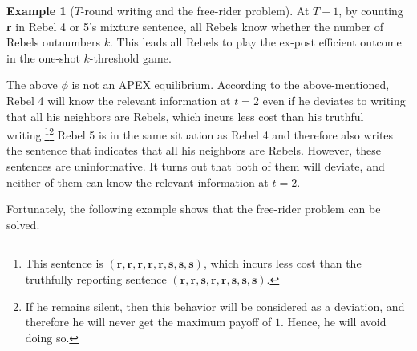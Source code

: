 \documentclass[12pt,letter]{article}
\newcommand\omicron{o}
\theoremstyle{definition}
\newtheorem{example}{Example}
\theoremstyle{definition}
\theoremstyle{remark}
\theoremstyle{claim}
\begin{document}
\begin{example}[$T$-round writing and the free-rider problem]
At $T+1$, by counting \textbf{r} in Rebel 4 or 5's mixture sentence, all Rebels know whether the number of Rebels outnumbers $k$. This leads all Rebels to play the ex-post efficient outcome in the one-shot $k$-threshold game. 

The above $\phi$ is not an APEX equilibrium. According to the above-mentioned, Rebel 4 will know the relevant information at $t=2$ even if he deviates to writing that all his neighbors are Rebels, which incurs less cost than his truthful writing.\footnote{This sentence is $(\textbf{r},\textbf{r},\textbf{r},\textbf{r},\textbf{r},\textbf{s},\textbf{s},\textbf{s})$, which incurs less cost than the truthfully reporting sentence $(\textbf{r},\textbf{r},\textbf{s},\textbf{r},\textbf{r},\textbf{s},\textbf{s},\textbf{s})$.}\footnote{If he remains silent, then this behavior will be considered as a deviation, and therefore he will never get the maximum payoff of $1$. Hence, he will avoid doing so.}
Rebel 5 is in the same situation as Rebel 4 and therefore also writes the sentence that indicates that all his neighbors are Rebels. However, these sentences are uninformative. It turns out that both of them will deviate, and neither of them can know the relevant information at $t=2$.


\end{example}

Fortunately, the following example shows that the free-rider problem can be solved. 
\end{document}
